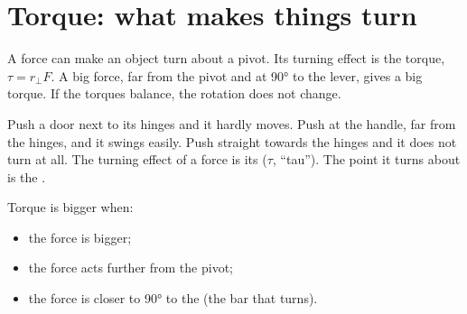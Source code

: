 \section{Torque: what makes things turn}\label{ch3:sec:torque}

\begin{bigidea}
A force can make an object turn about a pivot. Its turning effect is the torque,
$\tau = r_\perp F$. A big force, far from the pivot and at \ang{90} to the lever, gives a big
torque. If the torques balance, the rotation does not change.
\end{bigidea}

\begin{keywords}
\end{keywords}

Push a door next to its hinges and it hardly moves. Push at the handle, far from the hinges,
and it swings easily. Push straight towards the hinges and it does not turn at all. The turning
effect of a force is its  ($\tau$, ``tau''). The point it turns about is the
.

Torque is bigger when:
\begin{itemize}
  \item the force is bigger;
  \item the force acts further from the pivot;
  \item the force is closer to \ang{90} to the  (the bar that turns).
\end{itemize}

